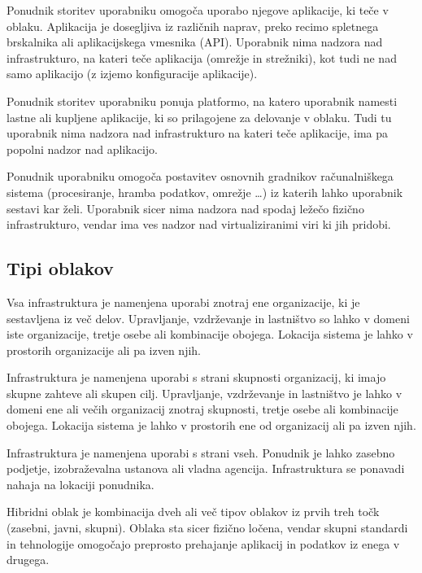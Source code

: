 \documentclass[12pt,a4paper,openany,tikz]{book}
\theoremstyle{plain}
\theoremstyle{definition}
\begin{document}
\begin{description}[style=nextline]
	\item[\gls{SaaS}] Ponudnik storitev uporabniku omogoča uporabo njegove aplikacije, ki teče v oblaku. Aplikacija je dosegljiva iz različnih naprav, preko recimo spletnega brskalnika ali aplikacijskega vmesnika (API). Uporabnik nima nadzora nad infrastrukturo, na kateri teče aplikacija (omrežje in strežniki), kot tudi ne nad samo aplikacijo (z izjemo konfiguracije aplikacije).

	\item[\gls{PaaS}] Ponudnik storitev uporabniku ponuja platformo, na katero uporabnik namesti lastne ali kupljene aplikacije, ki so prilagojene za delovanje v oblaku. Tudi tu uporabnik nima nadzora nad infrastrukturo na kateri teče aplikacije, ima pa popolni nadzor nad aplikacijo.

	\item[\gls{IaaS}] Ponudnik uporabniku omogoča postavitev osnovnih gradnikov računalniškega sistema (procesiranje, hramba podatkov, omrežje …) iz katerih lahko uporabnik sestavi kar želi. Uporabnik sicer nima nadzora nad spodaj ležečo fizično infrastrukturo, vendar ima ves nadzor nad virtualiziranimi viri ki jih pridobi.
\end{description}

\subsection{Tipi oblakov}
\label{sub:Tipi oblakov}
\begin{description}[style=nextline]
	\item[Zasebni oblak] Vsa infrastruktura je namenjena uporabi znotraj ene organizacije, ki je sestavljena iz več delov. Upravljanje, vzdrževanje in lastništvo so lahko v domeni iste organizacije, tretje osebe ali kombinacije obojega. Lokacija sistema je lahko v prostorih organizacije ali pa izven njih.

	\item[Skupni oblak] Infrastruktura je namenjena uporabi s strani skupnosti organizacij, ki imajo skupne zahteve ali skupen cilj. Upravljanje, vzdrževanje in lastništvo je lahko v domeni ene ali večih organizacij znotraj skupnosti, tretje osebe ali kombinacije obojega. Lokacija sistema je lahko v prostorih ene od organizacij ali pa izven njih.

	\item[Javni oblak] Infrastruktura je namenjena uporabi s strani vseh. Ponudnik je lahko zasebno podjetje, izobraževalna ustanova ali vladna agencija. Infrastruktura se ponavadi nahaja na lokaciji ponudnika.

  \item[Hibridni oblak] Hibridni oblak je kombinacija dveh ali več tipov oblakov iz prvih treh točk (zasebni, javni, skupni). Oblaka sta sicer fizično ločena, vendar skupni standardi in tehnologije omogočajo preprosto prehajanje aplikacij in podatkov iz enega v drugega.
\end{description}
\end{document}
